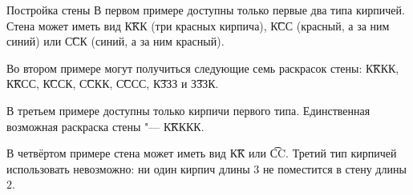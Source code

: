 \begin{problem}{Постройка стены}
В первом примере доступны только первые два типа кирпичей.
Стена может иметь вид
\t{ККК} (три красных кирпича),
\t{КСС} (красный, а за ним синий) или
\t{ССК} (синий, а за ним красный).

Во втором примере могут получиться следующие семь раскрасок стены:
\t{КККК}, \t{ККСС}, \t{КССК}, \t{ССКК}, \t{СССС}, \t{КЗЗЗ} и \t{ЗЗЗК}.

В третьем примере доступны только кирпичи первого типа.
Единственная возможная раскраска стены "--- \t{ККККК}.

В четвёртом примере стена может иметь вид \t{КК} или \t{CC}.
Третий тип кирпичей использовать невозможно: ни один кирпич длины $3$
не поместится в стену длины $2$.

%

\end{problem}
